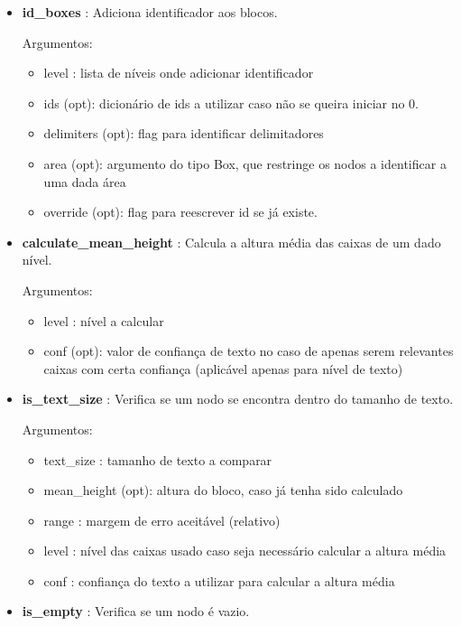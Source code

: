 \begin{itemize}\setlength\itemsep{0.05cm}
	\item \textbf{id\_boxes} : Adiciona identificador aos blocos.
	
	Argumentos:
		\begin{itemize}\setlength\itemsep{0.05cm}
			\item level : lista de níveis onde adicionar identificador
			\item ids (opt): dicionário de ids a utilizar caso não se queira iniciar no 0.
			\item delimiters (opt): flag para identificar delimitadores
			\item area (opt): argumento do tipo Box, que restringe os nodos a identificar a uma dada área
			\item override (opt): flag para reescrever id se já existe.
		\end{itemize}
				
	\item \textbf{calculate\_mean\_height} : Calcula a altura média das caixas de um dado nível.
	
	Argumentos:
	\begin{itemize}\setlength\itemsep{0.05cm}
		\item level : nível a calcular
		\item conf (opt): valor de confiança de texto no caso de apenas serem relevantes caixas com certa confiança (aplicável apenas para nível de texto)
	\end{itemize}
	
	
	\item \textbf{is\_text\_size} : Verifica se um nodo se encontra dentro do tamanho de texto.
	
	Argumentos:
	\begin{itemize}\setlength\itemsep{0.05cm}
		\item text\_size : tamanho de texto a comparar
		\item mean\_height (opt): altura do bloco, caso já tenha sido calculado
		\item range : margem de erro aceitável (relativo)
		\item level : nível das caixas usado caso seja necessário calcular a altura média
		\item conf : confiança do texto a utilizar para calcular a altura média
	\end{itemize}
	
	\item \textbf{is\_empty} : Verifica se um nodo é vazio.
	

\end{itemize}
